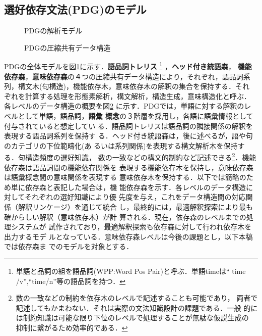 \subsection{選好依存文法(PDG)のモデル}

\begin{figure}[b]
 \begin{center}
 \end{center}
\myfiglabelskip
\caption{PDGの解析モデル}
\label{fig:PDGAnalysisModel}
\end{figure}

\begin{figure}[tb]
 \begin{center}
 \end{center}
\myfiglabelskip
\caption{PDGの圧縮共有データ構造}
\label{fig:PDGPackedSharedDataStructures}
\end{figure}

PDGの全体モデルを図\ref{fig:PDGAnalysisModel}に示す．{\bf 語品詞トレリス}
\footnote{単語と品詞の組を語品詞(WPP:Word Pos Pair)と呼ぶ．単語timeは``
time /v'',``time/n''等の語品詞を持つ．} ，{\bf ヘッド付き統語森}，{\bf 
機能依存森}，{\bf 意味依存森}の４つの圧縮共有データ構造により，それぞれ，語品詞系
列，構文木(句構造)，機能依存木，意味依存木の解釈の集合を保持する．それ
ぞれを計算する処理を形態素解析，構文解析，構造生成，意味構造化と呼ぶ．
各レベルのデータ構造の概要を図\ref{fig:PDGPackedSharedDataStructures}
に示す．PDGでは，単語に対する解釈のレベルとして単語，語品詞，{\bf 語彙
概念}の３階層を採用し，各語に語彙情報として付与されていると想定してい
る．語品詞トレリスは語品詞の隣接関係の解釈を表現する語品詞系列を保持す
る．ヘッド付き統語森は，後に述べるが，語や句のカテゴリの下位範疇化(あ
るいは系列関係)を表現する構文解析木を保持する．句構造頻度の選好知識，
数の一致などの構文的制約など記述できる\footnote{数の一致などの制約を依存木のレベルで記述することも可能であり，
両者で記述してもかまわない．それは実際の文法知識設計の課題である．一般
的には制約知識は可能な限り下位のレベルで処理することが無駄な仮説生成の
抑制に繋がるため効率的である．}．機能依存森は語品詞間の機能依存関係を
表現する機能依存木を保持し，意味依存森は語彙概念間の意味関係を表現する
意味依存木を保持する．以下では簡略のため単に依存森と表記した場合は，機
能依存森を示す．各レベルのデータ構造に対してそれぞれの選好知識により優
先度を与え，これをデータ構造間の対応関係（解釈リンケージ）を通じて統合
し，最終的には，最適解釈探索により最も確からしい解釈（意味依存木）が計
算される\cite{Hirakawa05d_j}．現在，依存森のレベルまでの処理システムが
試作されており，最適解釈探索も依存森に対して行われ依存木を出力するモデ
ルとなっている．意味依存森レベルは今後の課題とし，以下本稿では依存森ま
でのモデルを対象とする．


